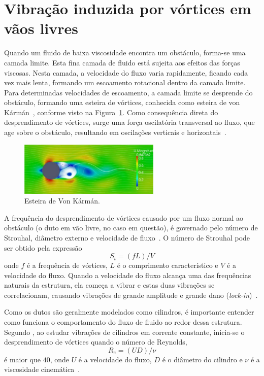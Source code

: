 \section{Vibração induzida por vórtices em vãos livres}\label{chap:viv}

Quando um fluido de baixa viscosidade encontra um obstáculo, forma-se uma camada limite.
Esta fina camada de fluido está sujeita aos efeitos das forças viscosas.
Nesta camada, a velocidade do fluxo varia rapidamente, ficando cada vez mais lenta, formando um escoamento rotacional dentro da camada limite.
Para determinadas velocidades de escoamento, a camada limite se desprende do obstáculo, formando uma esteira de vórtices, conhecida como esteira de von Kármán~\cite{Currie2002}, conforme visto na Figura~\ref{fig:viv_shading}.
Como consequência direta do desprendimento de vórtices, surge uma força oscilatória transversal ao fluxo, que age sobre o obstáculo, resultando em oscilações verticais e horizontais~\cite{Nielsen2002}.

\begin{figure}[!ht]
    \centering
    \caption{Esteira de Von Kármán.}\label{fig:viv_shading}
    \includegraphics[width=0.6\textwidth]{imagens/viv_shading}
\end{figure}

A frequência do desprendimento de vórtices causado por um fluxo normal ao obstáculo (o duto em vão livre, no caso em questão), é governado pelo número de Strouhal, diâmetro externo e velocidade de fluxo~\cite{Mork2003}.
O número de Strouhal pode ser obtido pela expressão
\begin{equation}
    S_t = (f L) / V
\end{equation}
onde $f$ é a frequência de vórtices, $L$ é o comprimento característico e $V$ é a velocidade do fluxo.
Quando a velocidade do fluxo alcança uma das frequências naturais da estrutura, ela começa a vibrar e estas duas vibrações se correlacionam, causando vibrações de grande amplitude e grande dano (\textit{lock-in})~\cite{Mork2003}.

Como os dutos são geralmente modelados como cilindros, é importante entender como funciona o comportamento do fluxo de fluido ao redor dessa estrutura. Segundo , ao estudar vibrações de cilindros em corrente constante, inicia-se o desprendimento de vórtices quando o número de Reynolds,
\begin{equation}
    R_e = (U D)/\nu
\end{equation}
é maior que $40$, onde $U$ é a velocidade do fluxo, $D$ é o diâmetro do cilindro e $\nu$ é a viscosidade cinemática~\cite{Sumer1995}.

